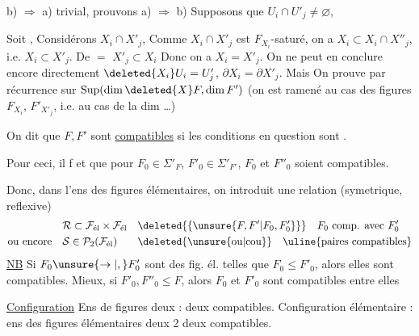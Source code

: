 b) $\Rightarrow$ a) trivial, prouvons a) $\Rightarrow$ b)  Supposons que $U_i\cap U'_j\ne\varnothing$,  


 Soit  , Considérons $X_i\cap X'_j$,  Comme $X_i\cap X'_j$ est  $F_{X_i}$-saturé,    on a $X_i\subset X_i\cap X''_j$,
 i.e. $X_i\subset X'_j$. De $=$ $X'_j\subset X_i$ Donc on a $X_i=X'_j$. On ne peut en conclure encore directement $\deleted{X_i}U_i=U'_j$,   $\partial X_i=\partial X'_j$. Mais
On  prouve  par récurrence sur  $\operatorname{Sup}(\dim\deleted{X}F,\dim F')$ (on est ramené au cas des figures $F_{X_i}$, $F'_{X'_j}$, i.e. au cas de la dim \ldots)

On dit que $F,F'$ sont \uline{compatibles} si les conditions en question sont .

Pour ceci, il f et  que pour  $F_0\in\Sigma'_F$, $F'_0\in\Sigma'_{F'}$, $F_0$ et $F''_0$ soient compatibles.

Donc, dans l'ens  des figures élémentaires, on introduit une relation (symetrique, reflexive)
\[
\begin{aligned}
&\mathcal{R}\subset\mathcal{F}_{\text{él}}\times\mathcal{F}_{\text{él}}&&\deleted{\{\unsure{F,F'|F_0,F'_0}\}}\quad \text{$F_0$ comp. avec $F'_0$}\\
\text{ou encore}\quad&\mathcal{S}\in\mathcal{P}_2(\mathcal{F}_{\text{él}})&&\deleted{\text{\unsure{ou|cou}}}\quad\text{\uline{paires compatibles}}
\end{aligned}
\]
\uline{NB} Si  $F_0\unsure{\to|,} F'_0$ sont des fig. él. telles que $F_0\le F'_0$, alors elles sont compatibles. Mieux, si $F'_0,F''_0\le F$, alors $F_0$ et $F'_0$ sont compatibles entre elles

\uline{Configuration} Ens de figures deux : deux compatibles. Configuration élémentaire : ens des figures élémentaires deux 2 deux compatibles.

